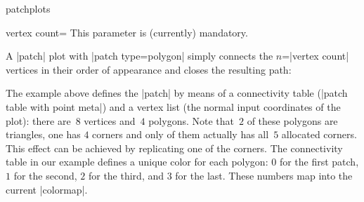 {\begin{pgfplotslibrary}{patchplots}
\begin{pgfplotskey}{vertex count=}
    This parameter is (currently) mandatory.
\end{pgfplotskey}

A |patch| plot with |patch type=polygon| simply connects the $n$=|vertex count|
vertices in their order of appearance and closes the resulting path:
%
\begin{codeexample}[]
\end{codeexample}
%
\noindent The example above defines the |patch| by means of a connectivity
table (|patch table with point meta|) and a vertex list (the normal input
coordinates of the plot): there are~$8$ vertices and~$4$ polygons. Note
that~$2$ of these polygons are triangles, one has $4$ corners and only of them
actually has all~$5$ allocated corners. This effect can be achieved by
replicating one of the corners. The connectivity table in our example defines a
unique color for each polygon: $0$ for the first patch, $1$ for the second, $2$
for the third, and $3$ for the last. These numbers map into the current
|colormap|.


\end{pgfplotslibrary}}

